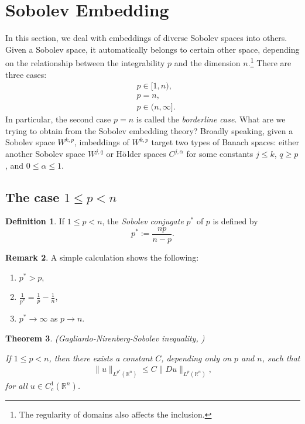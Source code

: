 \documentclass[11pt,a4paper]{report}
\newtheorem{theorem}{Theorem}[section]
\theoremstyle{definition}
\newtheorem{definition}[theorem]{Definition}
\newtheorem{remark}[theorem]{Remark}
\begin{document}
\section{Sobolev Embedding}

In this section, we deal with embeddings of diverse Sobolev spaces into others.
Given a Sobolev space, it automatically belongs to certain other space, depending on the relationship between the integrability $p$ and the dimension $n$.\footnote{The regularity of domains also affects the inclusion.}
There are three cases:
\begin{align*}
    &p \in [1, n), \\
    &p = n, \\
    &p \in (n, \infty].
\end{align*}
In particular, the second case $p = n$ is called the \emph{borderline case}. 
What are we trying to obtain from the Sobolev embedding theory?
Broadly speaking, given a Sobolev space $W^{k, p}$, imbeddings of $W^{k, p}$ target two types of Banach spaces: either another Sobolev space $W^{j, q}$ or H$\ddot{\rm o}$lder spaces $C^{j, \alpha}$ for some constants $j \leq k$, $q \geq p$, and $0 \leq \alpha \leq 1$.

\subsection{The case $1 \leq p < n$}

\begin{definition}
    If $1 \leq p < n$, the \emph{Sobolev conjugate} $p^{\ast}$ of $p$ is defined by 
    \begin{equation*} 
        p^{\ast} := \frac{np}{n-p}.
    \end{equation*}
\end{definition}

\begin{remark}
    A simple calculation shows the following:
    \begin{enumerate}[label=(\roman*)] 
    \rm\item $p^{\ast} > p$,
    \rm\item $\displaystyle \frac{1}{p^{\ast}} = \frac{1}{p} - \frac{1}{n}$,
    \rm\item $p^{\ast} \to \infty$ as $p \to n$.
    \end{enumerate}
\end{remark}

\begin{theorem}
    \emph{(Gagliardo-Nirenberg-Sobolev inequality, \cite{2010_Evans})}

    If $1 \leq p < n$, then there exists a constant $C$, depending only on $p$ and $n$, such that
    \begin{align*}
    \|u\|_{L^{p^*}\left(\mathbb{R}^n\right)} \leq C\|D u\|_{L^p\left(\mathbb{R}^n\right)},
    \end{align*}
    for all $u \in C_c^1\left(\mathbb{R}^n\right)$.
\end{theorem}
\end{document}
